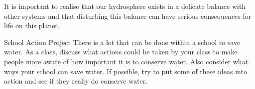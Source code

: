      \label{m38138*id342412}It is important to realise that our hydrosphere exists in a delicate balance with other systems and that disturbing this balance can have serious consequences for life on this planet.\par 
\label{m38138*secfhsst!!!underscore!!!id1065}
            \begin{project}{School Action Project
      }
            \nopagebreak
      \label{m38138*id342430}There is a lot that can be done within a school to save water. As a class, discuss what actions could be taken by your class to make people more aware of how important it is to conserve water. Also consider what ways your school can save water. If possible, try to put some of these ideas into action and see if they really do conserve water.
 \par 
\end{project}
